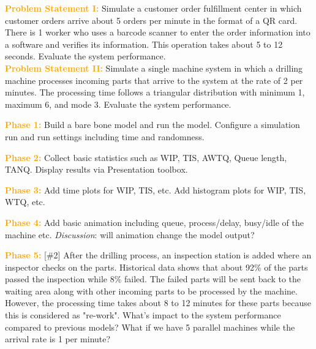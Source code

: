 \documentclass{article}
\begin{document}
\vskip 0.3in

\textcolor{orange}{\bf Problem Statement I:}  Simulate a customer order fulfillment center in which customer orders arrive about 5 orders per minute in the format of a QR card. There is 1 worker who uses a barcode scanner to enter the order information into a software and verifies its information. This operation takes about 5 to 12 seconds. Evaluate the system performance. \\

\textcolor{orange}{\bf Problem Statement II:}  Simulate a single machine system in which a drilling machine processes incoming parts that arrive to the system at the rate of 2 per minutes. The processing time follows a triangular distribution with minimum 1, maximum 6, and mode 3.  Evaluate the system performance.  \\

\vskip 0.3in

\textcolor{orange}{\bf Phase 1:} Build a bare bone model and run the model. Configure a simulation run and run settings including time and randomness. 

\vskip 0.3in

\textcolor{orange}{\bf Phase 2:} Collect basic statistics such as WIP, TIS, AWTQ, Queue length, TANQ. Display results via Presentation toolbox. 
  
\vskip 0.3in

\textcolor{orange}{\bf Phase 3:} Add time plots for WIP, TIS, etc. Add histogram plots for WIP, TIS, WTQ, etc. 

\vskip 0.3in

\textcolor{orange}{\bf Phase 4:} Add basic animation including queue, process/delay, busy/idle of the machine etc. \textit{Discussion}: will animation change the model output?

\vskip 0.3in

\textcolor{orange}{\bf Phase 5:} [\#2] After the drilling process, an inspection station is added where an inspector checks on the parts. Historical data shows that about 92\% of the parts passed the inspection while
8\% failed. The failed parts will be sent back to the waiting area along with other incoming parts to be processed by the machine. However, the processing time takes about 8 to 12 minutes for these parts because 
this is considered as "re-work". What's impact to the system performance compared to previous models? What if we have 5 parallel machines while the arrival rate is 1 per minute?
\end{document}
